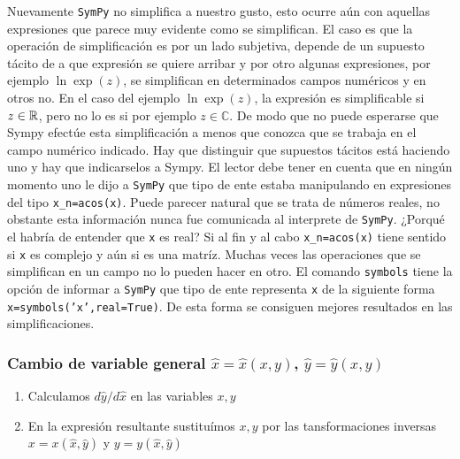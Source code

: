 Nuevamente \texttt{SymPy} no simplifica a nuestro gusto, esto ocurre aún con aquellas expresiones que parece muy evidente como se simplifican. El caso es que la operación de simplificación es por un lado  subjetiva, depende de un supuesto tácito de a que expresión se quiere arribar y por otro algunas expresiones, por ejemplo $\ln\exp(z)$, se simplifican en determinados campos numéricos y en otros no. En el caso del ejemplo $\ln\exp(z)$, la expresión es simplificable si $z\in\mathbb{R}$, pero no lo es si por ejemplo $z\in\mathbb{C}$. De modo que no puede esperarse que Sympy efectúe esta simplificación a menos que conozca que se trabaja en el campo numérico indicado. Hay que distinguir que supuestos tácitos está haciendo uno y hay que indicarselos a Sympy.    El lector debe tener en cuenta que en ningún momento uno le dijo a \texttt{SymPy} que tipo de ente estaba manipulando en expresiones del tipo \texttt{x\_n=acos(x)}. Puede parecer natural que se trata de números reales, no obstante esta 
información nunca fue comunicada al interprete de \texttt{SymPy}. ¿Porqué el habría de entender que \texttt{x} es real? Si al fin y al cabo \texttt{x\_n=acos(x)} tiene sentido si \texttt{x} es complejo y aún si es una matríz. Muchas veces las operaciones que se simplifican en un campo no lo pueden hacer en otro. El comando  \texttt{symbols} tiene la opción de informar a \texttt{SymPy} que tipo de ente representa \texttt{x} de la siguiente forma
\texttt{x=symbols('x',real=True)}. De esta forma se consiguen mejores resultados en las simplificaciones.


\subsubsection{Cambio de variable general $\hat{x}=\hat{x}(x,y)$, $\hat{y}=\hat{y}(x,y)$}
\begin{enumerate}
  \item Calculamos $d\hat{y}/d\hat{x}$ en las variables $x,y$

   \item En la expresión resultante sustituímos $x,y$ por las tansformaciones 			inversas $x=x(\hat{x},\hat{y})$ y  $y=y(\hat{x},\hat{y})$
\end{enumerate}



